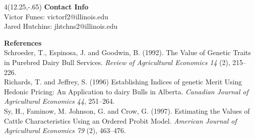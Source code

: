 \documentclass[final]{beamer}
\newlength{\onecolwid}
\newlength{\fourcolwid}
\begin{document}
\begin{frame}[t]
\begin{columns}[t]
\begin{column}{\onecolwid}
\end{column} %
\end{columns} %

\begin{columns}[t]
\begin{column}{\fourcolwid}
\begin{textblock}{4}(12.25,-.65)
\centering
 \textbf{Contact Info}\\
 Victor Funes: victorf2@illinois.edu\\
 Jared Hutchins: jhtchns2@illinois.edu\\
\end{textblock}
\footnotesize
\textbf{References}\\
\footnotesize
Schroeder, T., Espinosa, J. and Goodwin, B. (1992). The Value of Genetic Traits in Purebred Dairy Bull Services. \emph{Review of Agricultural Economics 14} (2), 215--226.\\
Richards, T. and Jeffrey, S. (1996) Establishing Indices of genetic Merit Using Hedonic Pricing: An Application to dairy Bulls in Alberta. \emph{Canadian Journal of Agricultural Economics 44}, 251--264. \\
Sy, H., Faminow, M. Johnson, G. and Crow, G. (1997). Estimating the Values of Cattle Characteristics Using an Ordered Probit Model. \emph{American Journal of Agricultural Economics 79} (2), 463--476.\\
\end{column}
\end{columns}
\end{frame} %
\end{document}
